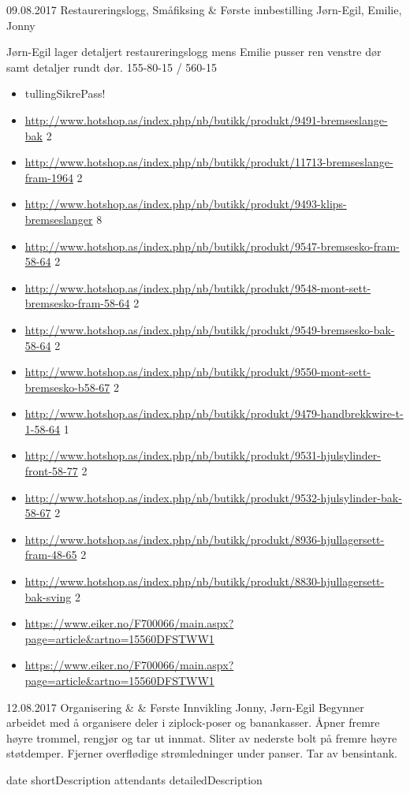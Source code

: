 \worklogitem
	{09.08.2017}
	{Restaureringslogg, Småfiksing \& Første innbestilling}
	{J\o rn-Egil, Emilie, Jonny}
	{J\o rn-Egil lager detaljert restaureringslogg mens Emilie pusser ren venstre d\o r samt detaljer rundt d\o r. 155-80-15 / 560-15
	\begin{itemize}

		\item tullingSikrePass!
		\item \url{http://www.hotshop.as/index.php/nb/butikk/produkt/9491-bremseslange-bak} 2
		\item \url{http://www.hotshop.as/index.php/nb/butikk/produkt/11713-bremseslange-fram-1964} 2
		\item \url{http://www.hotshop.as/index.php/nb/butikk/produkt/9493-klips-bremseslanger} 8
		\item \url{http://www.hotshop.as/index.php/nb/butikk/produkt/9547-bremsesko-fram-58-64} 2
		\item \url{http://www.hotshop.as/index.php/nb/butikk/produkt/9548-mont-sett-bremsesko-fram-58-64} 2
		\item \url{http://www.hotshop.as/index.php/nb/butikk/produkt/9549-bremsesko-bak-58-64} 2
		\item \url{http://www.hotshop.as/index.php/nb/butikk/produkt/9550-mont-sett-bremsesko-b58-67} 2
		\item \url{http://www.hotshop.as/index.php/nb/butikk/produkt/9479-handbrekkwire-t-1-58-64} 1
		\item \url{http://www.hotshop.as/index.php/nb/butikk/produkt/9531-hjulsylinder-front-58-77} 2
		\item \url{http://www.hotshop.as/index.php/nb/butikk/produkt/9532-hjulsylinder-bak-58-67} 2
		\item \url{http://www.hotshop.as/index.php/nb/butikk/produkt/8936-hjullagersett-fram-48-65} 2
		\item \url{http://www.hotshop.as/index.php/nb/butikk/produkt/8830-hjullagersett-bak-sving} 2

		\item \url{https://www.eiker.no/F700066/main.aspx?page=article&artno=15560DFSTWW1}
		\item \url{https://www.eiker.no/F700066/main.aspx?page=article&artno=15560DFSTWW1}
	\end{itemize}
	}


\worklogitem
	{12.08.2017}
	{Organisering & \& F\o rste Innvikling}
	{Jonny, J\o rn-Egil}
	{Begynner arbeidet med å organisere deler i ziplock-poser og banankasser. Åpner fremre høyre trommel, rengjør og tar ut innmat. Sliter av nederste bolt på fremre høyre støtdemper. Fjerner overflødige strømledninger under panser. Tar av bensintank.}

\worklogitem
	{date}
	{shortDescription}
	{attendants}
	{detailedDescription}
